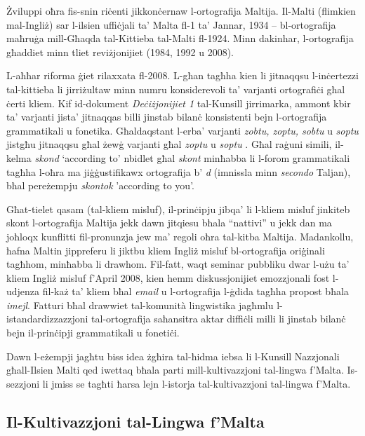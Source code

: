 \documentclass[]{../../metanetpaper}
\begin{document}
\begin{multicols}{2}
Żviluppi oħra fis-snin riċenti jikkonċernaw l-ortografija Maltija. Il-Malti (flimkien mal-Ingliż) sar l-ilsien uffiċjali ta’ Malta fl-1 ta’ Jannar, 1934 – bl-ortografija maħruġa mill-Għaqda tal-Kittieba tal-Malti fl-1924. Minn dakinhar, l-ortografija għaddiet minn tliet reviżjonijiet (1984, 1992 u 2008).

L-aħħar riforma ġiet rilaxxata fl-2008. L-għan tagħha kien li jitnaqqsu l-inċertezzi tal-kittieba li jirriżultaw minn numru konsiderevoli ta’ varjanti ortografiċi għal ċerti kliem. Kif id-dokument \emph{Deċiżjonijiet 1} \cite{Kunsill:2008a} tal-Kunsill  jirrimarka, ammont kbir ta’ varjanti jista' jitnaqqas billi jinstab bilanċ konsistenti bejn l-ortografija grammatikali u fonetika. Għaldaqstant l-erba’ varjanti \emph{zobtu, zoptu, sobtu} u \emph{soptu} jistgħu jitnaqqsu għal żewġ varjanti għal \emph{zoptu}  u \emph{soptu} . Għal raġuni simili, il-kelma \emph{skond}  `according to' nbidlet għal \emph{skont} minħabba li l-forom grammatikali tagħha l-oħra ma jiġġustifikawx ortografija b’ \emph{d} (imnissla minn \emph{secondo} Taljan), bħal pereżempju \emph{skontok}  'according to you'.

Għat-tielet qasam (tal-kliem misluf), il-prinċipju jibqa’ li l-kliem misluf jinkiteb skont l-ortografija Maltija jekk dawn jitqiesu bħala ``nattivi'' u jekk dan ma joħloqx kunflitti fil-pronunzja jew ma’ regoli oħra tal-kitba Maltija. Madankollu, ħafna Maltin jippreferu li jiktbu kliem Ingliż misluf bl-ortografija oriġinali tagħhom, minħabba li drawhom. Fil-fatt, waqt seminar pubbliku dwar l-użu ta’ kliem Ingliż misluf f'April 2008, kien hemm diskussjonijiet emozzjonali fost l-udjenza fil-każ ta’ kliem bħal \emph{email} u l-ortografija l-ġdida tagħha propost bħala \emph{imejl}. Fatturi bħal drawwiet tal-komunità lingwistika jagħmlu l-istandardizzazzjoni tal-ortografija saħansitra aktar diffiċli milli li jinstab bilanċ bejn il-prinċipji grammatikali u fonetiċi.

Dawn l-eżempji jagħtu biss idea żgħira tal-ħidma iebsa li l-Kunsill Nazzjonali għall-Ilsien Malti qed iwettaq bħala parti mill-kultivazzjoni tal-lingwa f'Malta. Is-sezzjoni li jmiss se tagħti ħarsa lejn l-istorja tal-kultivazzjoni tal-lingwa f'Malta.

\subsection{Il-Kultivazzjoni tal-Lingwa f'Malta}


\end{multicols}
\end{document}
